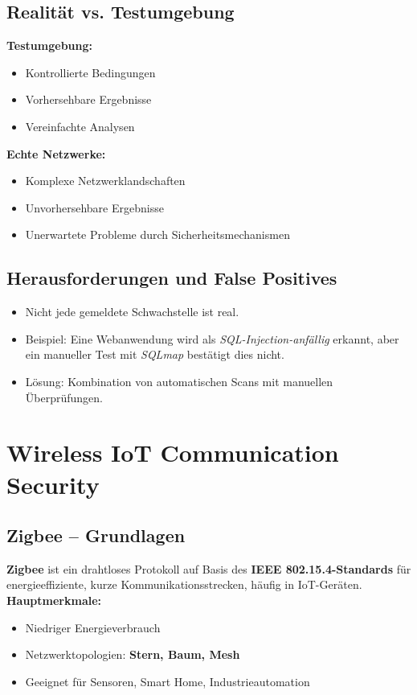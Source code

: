 \subsection{Realität vs. Testumgebung}
\textbf{Testumgebung:}
\begin{itemize}
    \item Kontrollierte Bedingungen
    \item Vorhersehbare Ergebnisse
    \item Vereinfachte Analysen
\end{itemize}
\noindent
\textbf{Echte Netzwerke:}
\begin{itemize}
    \item Komplexe Netzwerklandschaften
    \item Unvorhersehbare Ergebnisse
    \item Unerwartete Probleme durch Sicherheitsmechanismen
\end{itemize}

\subsection{Herausforderungen und False Positives}
\begin{itemize}
    \item Nicht jede gemeldete Schwachstelle ist real.
    \item Beispiel: Eine Webanwendung wird als \textit{SQL-Injection-anfällig} erkannt, aber ein manueller Test mit \textit{SQLmap} bestätigt dies nicht.
    \item Lösung: Kombination von automatischen Scans mit manuellen Überprüfungen.
\end{itemize}

\section{Wireless IoT Communication Security}

\subsection{Zigbee – Grundlagen}
\textbf{Zigbee} ist ein drahtloses Protokoll auf Basis des \textbf{IEEE 802.15.4-Standards} für energieeffiziente, kurze Kommunikationsstrecken, häufig in IoT-Geräten.\\
\textbf{Hauptmerkmale:}
\begin{itemize}
    \item Niedriger Energieverbrauch
    \item Netzwerktopologien: \textbf{Stern, Baum, Mesh}
    \item Geeignet für Sensoren, Smart Home, Industrieautomation
\end{itemize}

